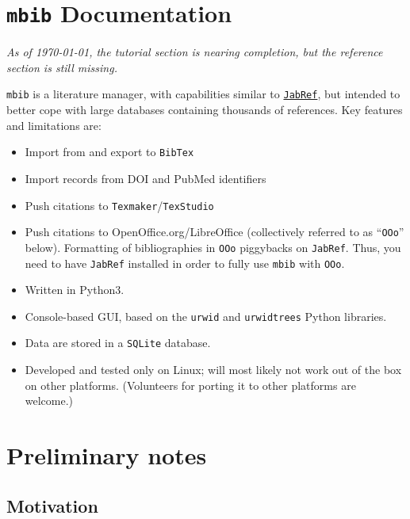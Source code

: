 \documentclass[10pt]{article}
\newcommand*{\mbib}{\texttt{mbib}\xspace}
\newcommand*{\jabref}{\texttt{JabRef}\xspace}
\newcommand*{\ooo}{\texttt{OOo}\xspace}
\newcommand*{\bibtex}{\texttt{BibTex}\xspace}
\newcommand*{\sqlite}{\texttt{SQLite}\xspace}
\begin{document}
\section*{\mbib Documentation}

\emph{As of \today, the tutorial section is nearing completion, but the reference section is still missing.}

\bigskip

\noindent \mbib is a literature manager, with capabilities similar to \href{http://www.jabref.org}{\jabref}, but intended to better cope with large databases containing thousands of references.  Key features and limitations are:

\begin{itemize}
\item Import from and export to \bibtex  

\item Import records from DOI and PubMed identifiers

\item Push citations to \texttt{Texmaker}/\texttt{TexStudio}

\item Push citations to OpenOffice.org/LibreOffice (collectively referred to as ``\ooo'' below). Formatting of bibliographies in \ooo piggybacks on \jabref. Thus, you need to have \jabref installed in order to fully use \mbib with \ooo.

\item Written in Python3.

\item Console-based GUI, based on the \texttt{urwid} and
\texttt{urwidtrees} Python libraries. 

\item Data are stored in a \sqlite database.

\item Developed and tested only on Linux; will most likely not work out of the box on other platforms. (Volunteers for porting it to other platforms are welcome.)

\end{itemize}

\section{Preliminary notes}

\subsection{Motivation}
\end{document}
